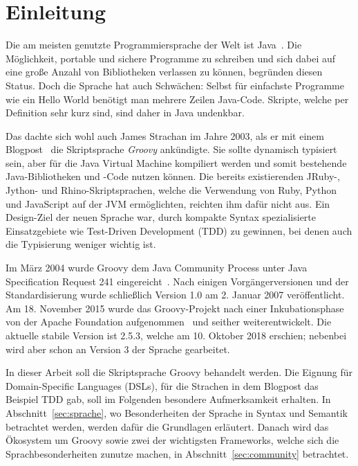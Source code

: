 \documentclass[a4paper]{article}
\title{\paperTitle}
\author{\paperAuthor}
\date{\paperDate}
\begin{document}

\maketitle


\section{Einleitung}\label{sec:einleitung}

Die am meisten genutzte Programmiersprache der Welt ist Java~\cite{tiobe-index}.
Die Möglichkeit, portable und sichere Programme zu schreiben und sich dabei auf eine große Anzahl von Bibliotheken verlassen zu können, begründen diesen Status.
Doch die Sprache hat auch Schwächen:
Selbst für einfachste Programme wie ein Hello World benötigt man mehrere Zeilen Java-Code.
Skripte, welche per Definition sehr kurz sind, sind daher in Java undenkbar.

Das dachte sich wohl auch James Strachan im Jahre 2003, als er mit einem Blogpost~\cite{james-strachan-blog} die Skriptsprache \emph{Groovy} ankündigte.
Sie sollte dynamisch typisiert sein, aber für die Java Virtual Machine kompiliert werden und somit bestehende Java-Bibliotheken und -Code nutzen können.
Die bereits existierenden JRuby-, Jython- und Rhino-Skriptsprachen, welche die Verwendung von Ruby, Python und JavaScript auf der JVM ermöglichten, reichten ihm dafür nicht aus.
Ein Design-Ziel der neuen Sprache war, durch kompakte Syntax spezialisierte Einsatzgebiete wie Test-Driven Development (TDD) zu gewinnen, bei denen auch die Typisierung weniger wichtig ist.

Im März 2004 wurde Groovy dem Java Community Process unter Java Specification Request 241 eingereicht~\cite{jcp:jsr241}.
Nach einigen Vorgängerversionen und der Standardisierung wurde schließlich Version 1.0 am 2. Januar 2007 veröffentlicht.
Am 18. November 2015 wurde das Groovy-Projekt nach einer Inkubationsphase von der Apache Foundation aufgenommen~\cite{apache-incubator:groovy} und seither weiterentwickelt.
Die aktuelle stabile Version ist 2.5.3, welche am 10. Oktober 2018 erschien; nebenbei wird aber schon an Version 3 der Sprache gearbeitet.

In dieser Arbeit soll die Skriptsprache Groovy behandelt werden.
Die Eignung für Domain-Specific Languages (DSLs), für die Strachen in dem Blogpost das Beispiel TDD gab, soll im Folgenden besondere Aufmerksamkeit erhalten.
In Abschnitt~\ref{sec:sprache}, wo Besonderheiten der Sprache in Syntax und Semantik betrachtet werden, werden dafür die Grundlagen erläutert.
Danach wird das Ökosystem um Groovy sowie zwei der wichtigsten Frameworks, welche sich die Sprachbesonderheiten zunutze machen, in Abschnitt~\ref{sec:community} betrachtet.
\end{document}
